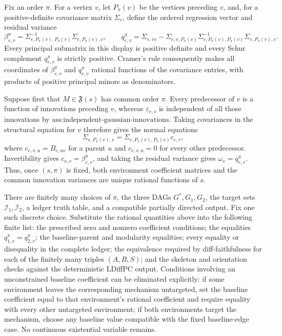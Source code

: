Fix an order \(\pi\).  For a vertex \(v\), let \(P_\pi(v)\) be the vertices preceding \(v\), and, for a positive-definite covariance matrix \(\Sigma_e\), define the ordered regression vector and residual variance
\[
 \beta_{e,v}^{\pi}
   =\Sigma_{e,P_\pi(v),P_\pi(v)}^{-1}
      \Sigma_{e,P_\pi(v),v},\qquad
 q_{e,v}^{\pi}
   =\Sigma_{e,vv}-\Sigma_{e,v,P_\pi(v)}
      \Sigma_{e,P_\pi(v),P_\pi(v)}^{-1}
      \Sigma_{e,P_\pi(v),v}.
\]
Every principal submatrix in this display is positive definite and every Schur complement \(q_{e,v}^{\pi}\) is strictly positive.  Cramer's rule consequently makes all coordinates of \(\beta_{e,v}^{\pi}\) and \(q_{e,v}^{\pi}\) rational functions of the covariance entries, with products of positive principal minors as denominators.

Suppose first that \(M\in\mathfrak F(s)\) has common order \(\pi\).  Every predecessor of \(v\) is a function of innovations preceding \(v\), whereas \(\varepsilon_{e,v}\) is independent of all those innovations by \(\text{ass:independent-gaussian-innovations}\).  Taking covariances in the structural equation for \(v\) therefore gives the normal equations
\[
 \Sigma_{e,P_\pi(v),v}
 =\Sigma_{e,P_\pi(v),P_\pi(v)}c_{e,v},
\]
where \(c_{e,v,u}=B_{e,uv}\) for a parent \(u\) and \(c_{e,v,u}=0\) for every other predecessor.  Invertibility gives \(c_{e,v}=\beta_{e,v}^{\pi}\), and taking the residual variance gives \(\omega_v=q_{e,v}^{\pi}\).  Thus, once \((s,\pi)\) is fixed, both environment coefficient matrices and the common innovation variances are unique rational functions of \(s\).

There are finitely many choices of \(\pi\), the three DAGs \(G^*,G_1,G_2\), the target sets \(\mathcal I_1,\mathcal I_2\), a ledger truth table, and a compatible partially directed output.  Fix one such discrete choice.  Substitute the rational quantities above into the following finite list: the prescribed zero and nonzero coefficient conditions; the equalities \(q_{1,v}^{\pi}=q_{2,v}^{\pi}\); the baseline-parent and modularity equalities; every equality or disequality in the complete ledger; the equivalence required by diff-faithfulness for each of the finitely many triples \((A,B,S)\); and the skeleton and orientation checks against the deterministic LDiffPC output.  Conditions involving an unconstrained baseline coefficient can be eliminated explicitly: if some environment leaves the corresponding mechanism untargeted, set the baseline coefficient equal to that environment's rational coefficient and require equality with every other untargeted environment; if both environments target the mechanism, choose any baseline value compatible with the fixed baseline-edge case.  No continuous existential variable remains.

